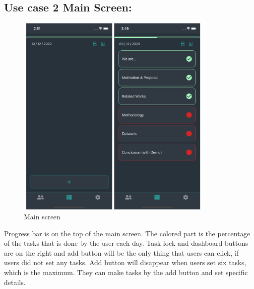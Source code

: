 \documentclass[conference]{IEEEtran}
\begin{document}
\subsection{Use case 2 Main Screen:}

\begin{figure}[h] \centering \includegraphics[width=270pt]{Main Screen최종.jpg} \caption{Main screen} \label{fig:Main Screen} \end{figure}

Progress bar is on the top of the main screen. The colored part is the percentage of the tasks that is done by the user each day. Task lock and dashboard buttons are on the right and add button will be the only thing that users can click, if users did not set any tasks. Add button will disappear when users set six tasks, which is the maximum. They can make tasks by the add button and set specific details.
\end{document}
